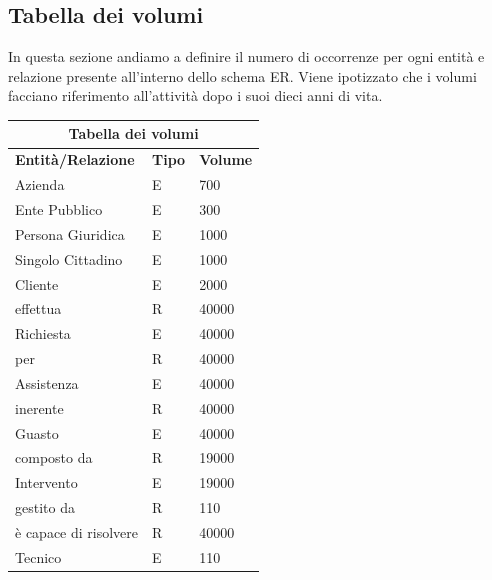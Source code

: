 \documentclass[legalpaper]{article}
\begin{document}
	\subsection{Tabella dei volumi}
		In questa sezione andiamo a definire il numero di occorrenze per ogni entità e relazione presente all'interno dello schema ER. Viene ipotizzato che i volumi facciano riferimento all'attività dopo i suoi dieci anni di vita.\\
		\newline
		\renewcommand\arraystretch{2}
		\begin{tabular}{ |p{5cm}|p{2cm}|p{5cm}| }
			\hline
			\multicolumn{3}{|c|}{\textbf{Tabella dei volumi}} \\
			\hline
			\textbf{Entità/Relazione} & \textbf{Tipo} & \textbf{Volume} \\
			\hline
			Azienda & E & 700 \\ \hline
			Ente Pubblico & E & 300 \\ \hline
			Persona Giuridica & E & 1000 \\ \hline
			Singolo Cittadino & E & 1000 \\ \hline
			Cliente & E & 2000 \\ \hline
			effettua & R & 40000 \\ \hline
			Richiesta & E & 40000 \\ \hline
			per & R & 40000 \\ \hline
			Assistenza & E & 40000 \\ \hline
			inerente & R & 40000 \\ \hline
			Guasto & E & 40000 \\ \hline
			composto da & R & 19000 \\ \hline
			Intervento & E & 19000 \\ \hline
			gestito da & R & 110 \\ \hline
			è capace di risolvere & R & 40000 \\ \hline
			Tecnico & E & 110 \\ \hline
		\end{tabular}

	
\end{document}
